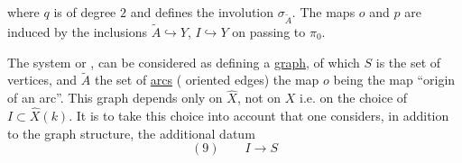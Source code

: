 where $q$ is of degree $2$ and defines the involution $\sigma_{\widetilde A}$. The maps $o$ and $p$ are induced by the inclusions $\widetilde A\hookrightarrow Y$, $I\hookrightarrow Y$ on passing to $\pi_0$.

The system
or
, can be considered as defining a \uline{graph}, of which $S$ is the set of vertices, and $\widetilde A$ the set of \uline{arcs} ( oriented edges) the map $o$ being the map ``origin of an arc''. This graph depends only on $\widehat X$, not on $X$ i.e. on the choice of $I\subset\widehat X(k)$. It is to take this choice into account that one considers, in addition to the graph structure, the additional datum
\[
(9)\qquad I\longrightarrow S
\]
